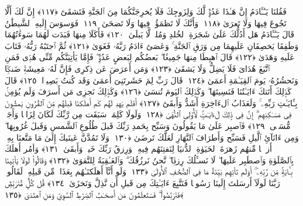  فَقُلنَا يَـٰٓـَٔادَمُ إِنَّ هَـٰذَا عَدُوٌّۭ لَّكَ وَلِزَوجِكَ فَلَا يُخرِجَنَّكُمَا مِنَ ٱلجَنَّةِ فَتَشقَىٰٓ ﴿١١٧﴾
 إِنَّ لَكَ أَلَّا تَجُوعَ فِيهَا وَلَا تَعرَىٰ ﴿١١٨﴾
 وَأَنَّكَ لَا تَظمَؤُا۟ فِيهَا وَلَا تَضحَىٰ ﴿١١٩﴾
 فَوَسوَسَ إِلَيهِ ٱلشَّيطَٰنُ قَالَ يَـٰٓـَٔادَمُ هَل أَدُلُّكَ عَلَىٰ شَجَرَةِ ٱلخُلدِ وَمُلكٍۢ لَّا يَبلَىٰ ﴿١٢٠﴾
 فَأَكَلَا مِنهَا فَبَدَت لَهُمَا سَوءَٰتُهُمَا وَطَفِقَا يَخصِفَانِ عَلَيهِمَا مِن وَرَقِ ٱلجَنَّةِ ۚ وَعَصَىٰٓ ءَادَمُ رَبَّهُۥ فَغَوَىٰ ﴿١٢١﴾
 ثُمَّ ٱجتَبَٰهُ رَبُّهُۥ فَتَابَ عَلَيهِ وَهَدَىٰ ﴿١٢٢﴾
 قَالَ ٱهبِطَا مِنهَا جَمِيعًۢا ۖ بَعضُكُم لِبَعضٍ عَدُوٌّۭ ۖ فَإِمَّا يَأتِيَنَّكُم مِّنِّى هُدًۭى فَمَنِ ٱتَّبَعَ هُدَاىَ فَلَا يَضِلُّ وَلَا يَشقَىٰ ﴿١٢٣﴾
 وَمَن أَعرَضَ عَن ذِكرِى فَإِنَّ لَهُۥ مَعِيشَةًۭ ضَنكًۭا وَنَحشُرُهُۥ يَومَ ٱلقِيَـٰمَةِ أَعمَىٰ ﴿١٢٤﴾
 قَالَ رَبِّ لِمَ حَشَرتَنِىٓ أَعمَىٰ وَقَد كُنتُ بَصِيرًۭا ﴿١٢٥﴾
 قَالَ كَذَٟلِكَ أَتَتكَ ءَايَـٰتُنَا فَنَسِيتَهَا ۖ وَكَذَٟلِكَ ٱليَومَ تُنسَىٰ ﴿١٢٦﴾
 وَكَذَٟلِكَ نَجزِى مَن أَسرَفَ وَلَم يُؤمِنۢ بِـَٔايَـٰتِ رَبِّهِۦ ۚ وَلَعَذَابُ ٱلءَاخِرَةِ أَشَدُّ وَأَبقَىٰٓ ﴿١٢٧﴾
 أَفَلَم يَهدِ لَهُم كَم أَهلَكنَا قَبلَهُم مِّنَ ٱلقُرُونِ يَمشُونَ فِى مَسَـٰكِنِهِم ۗ إِنَّ فِى ذَٟلِكَ لَءَايَـٰتٍۢ لِّأُو۟لِى ٱلنُّهَىٰ ﴿١٢٨﴾
 وَلَولَا كَلِمَةٌۭ سَبَقَت مِن رَّبِّكَ لَكَانَ لِزَامًۭا وَأَجَلٌۭ مُّسَمًّۭى ﴿١٢٩﴾
 فَٱصبِر عَلَىٰ مَا يَقُولُونَ وَسَبِّح بِحَمدِ رَبِّكَ قَبلَ طُلُوعِ ٱلشَّمسِ وَقَبلَ غُرُوبِهَا ۖ وَمِن ءَانَآئِ ٱلَّيلِ فَسَبِّح وَأَطرَافَ ٱلنَّهَارِ لَعَلَّكَ تَرضَىٰ ﴿١٣٠﴾
 وَلَا تَمُدَّنَّ عَينَيكَ إِلَىٰ مَا مَتَّعنَا بِهِۦٓ أَزوَٟجًۭا مِّنهُم زَهرَةَ ٱلحَيَوٰةِ ٱلدُّنيَا لِنَفتِنَهُم فِيهِ ۚ وَرِزقُ رَبِّكَ خَيرٌۭ وَأَبقَىٰ ﴿١٣١﴾
 وَأمُر أَهلَكَ بِٱلصَّلَوٰةِ وَٱصطَبِر عَلَيهَا ۖ لَا نَسـَٔلُكَ رِزقًۭا ۖ نَّحنُ نَرزُقُكَ ۗ وَٱلعَـٰقِبَةُ لِلتَّقوَىٰ ﴿١٣٢﴾
 وَقَالُوا۟ لَولَا يَأتِينَا بِـَٔايَةٍۢ مِّن رَّبِّهِۦٓ ۚ أَوَلَم تَأتِهِم بَيِّنَةُ مَا فِى ٱلصُّحُفِ ٱلأُولَىٰ ﴿١٣٣﴾
 وَلَو أَنَّآ أَهلَكنَـٰهُم بِعَذَابٍۢ مِّن قَبلِهِۦ لَقَالُوا۟ رَبَّنَا لَولَآ أَرسَلتَ إِلَينَا رَسُولًۭا فَنَتَّبِعَ ءَايَـٰتِكَ مِن قَبلِ أَن نَّذِلَّ وَنَخزَىٰ ﴿١٣٤﴾
 قُل كُلٌّۭ مُّتَرَبِّصٌۭ فَتَرَبَّصُوا۟ ۖ فَسَتَعلَمُونَ مَن أَصحَـٰبُ ٱلصِّرَٰطِ ٱلسَّوِىِّ وَمَنِ ٱهتَدَىٰ ﴿١٣٥﴾
 
